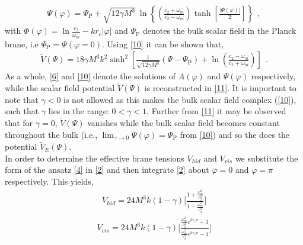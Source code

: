 \documentclass{article}
\begin{document}
\begin{align}
 \Psi(\varphi) = \Psi_\mathrm{P} + \sqrt{12\gamma M^3}~
 \ln{\left\{\left(\frac{c_2 + \omega_m}{c_2 - \omega_m}\right)\tanh\left[\frac{|\Phi(\varphi)|}{2}\right]\right\}}~~,
 \label{10}
\end{align}
with $\Phi(\varphi) = \ln{\frac{c_2}{\omega_m}} - kr_c|\varphi|$ and $\Psi_\mathrm{P}$ denotes the bulk scalar field in the Planck brane, 
i.e $\Psi_\mathrm{P} = \Psi(\varphi = 0)$. 
Using \ref{10} it can be shown that,
\begin{align}
\tilde{V}(\Psi) = 18\gamma M^3k^2 \sinh^{2}\left[\frac{1}{\sqrt{12\gamma M^3}}\left(\Psi - \Psi_\mathrm{P}\right) 
 + \ln{\left(\frac{c_2 - \omega_m}{c_2 + \omega_m}\right)}\right]~~.
 \label{11}
\end{align}
As a whole, \ref{6} and \ref{10} denote the solutions of $A(\varphi)$ and $\Psi(\varphi)$ respectively, while the scalar field potential 
$\tilde{V}(\Psi)$ is reconstructed in \ref{11}. It is important to note that $\gamma<0$ is not allowed as this makes the bulk scalar field complex (\ref{10}), such that $\gamma$ lies in the range: $0<\gamma<1$.
Further from \ref{11} it may be observed that 
for $\gamma = 0$, $\tilde{V}(\Psi)$ vanishes while the bulk scalar field becomes constant throughout the bulk
(i.e., $\lim_{\gamma \to 0} \Psi(\varphi) = \Psi_\mathrm{P}$ from \ref{10}) and so the does the potential $\tilde{V}_E(\Psi)$.\\


In order to determine the effective brane tensions $V_{hid}$ and $V_{vis}$ we substitute the form of the ansatz \ref{4} in \ref{2} and then integrate  \ref{2} about $\varphi=0$ and $\varphi=\pi$ respectively. This yields,
\begin{align}
V_{hid}=24M^3k (1-\gamma)\Bigg[\frac{1+\frac{\omega_m^2}{c_2^2}}{1-\frac{\omega_m^2}{c_2^2}}\Bigg]
\label{VHid}
\end{align}
\begin{align}
V_{vis}=24M^3k (1-\gamma)\Bigg[\frac{\frac{\omega_m^2}{c_2^2}e^{kr_c\pi} + 1}{\frac{\omega_m^2}{c_2^2}e^{kr_c\pi} -1 }\Bigg]
\label{VVis}
\end{align}




 
\end{document}
